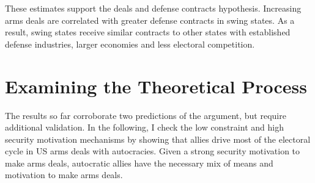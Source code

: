 \documentclass[12pt]{article}
\begin{document}
These estimates support the deals and defense contracts hypothesis. 
Increasing arms deals are correlated with greater defense contracts in swing states. 
As a result, swing states receive similar contracts to other states with established defense industries, larger economies and less electoral competition. 
%
%
%
%

%
%


\section{Examining the Theoretical Process}


The results so far corroborate two predictions of the argument, but require additional validation. 
In the following, I check the low constraint and high security motivation mechanisms by showing that allies drive most of the electoral cycle in US arms deals with autocracies.  
Given a strong security motivation to make arms deals, autocratic allies have the necessary mix of means and motivation to make arms deals.
\end{document}
